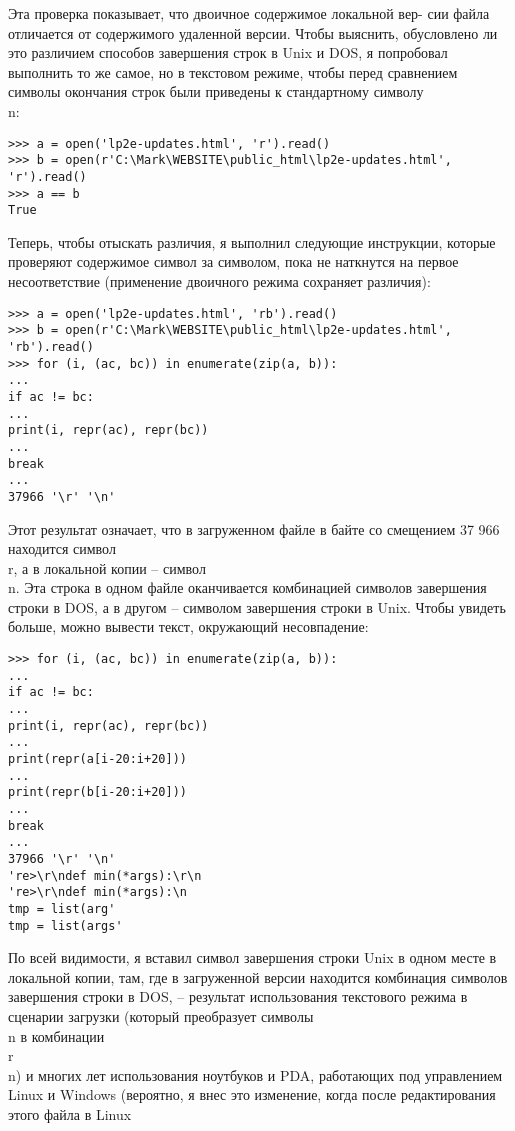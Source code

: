 \documentclass[12pt]{article}
\begin{document}
Эта проверка показывает, что двоичное содержимое локальной вер-
сии файла отличается от содержимого удаленной версии. Чтобы выяснить, обусловлено ли это различием способов завершения строк в Unix
и DOS, я попробовал выполнить то же самое, но в текстовом режиме,
чтобы перед сравнением символы окончания строк были приведены
к стандартному символу \\n:
\begin{verbatim}
>>> a = open('lp2e-updates.html', 'r').read()
>>> b = open(r'C:\Mark\WEBSITE\public_html\lp2e-updates.html', 'r').read()
>>> a == b
True
\end{verbatim}
Теперь, чтобы отыскать различия, я выполнил следующие инструкции,
которые проверяют содержимое символ за символом, пока не наткнутся на первое несоответствие (применение двоичного режима сохраняет
различия):
\begin{verbatim}
>>> a = open('lp2e-updates.html', 'rb').read()
>>> b = open(r'C:\Mark\WEBSITE\public_html\lp2e-updates.html', 'rb').read()
>>> for (i, (ac, bc)) in enumerate(zip(a, b)):
...
if ac != bc:
...
print(i, repr(ac), repr(bc))
...
break
...
37966 '\r' '\n'
\end{verbatim}
Этот результат означает, что в загруженном файле в байте со смещением 37 966 находится символ \\r, а в локальной копии – символ \\n. Эта
строка в одном файле оканчивается комбинацией символов завершения
строки в DOS, а в другом – символом завершения строки в Unix. Чтобы
увидеть больше, можно вывести текст, окружающий несовпадение:
\begin{verbatim}
>>> for (i, (ac, bc)) in enumerate(zip(a, b)):
...
if ac != bc:
...
print(i, repr(ac), repr(bc))
...
print(repr(a[i-20:i+20]))
...
print(repr(b[i-20:i+20]))
...
break
...
37966 '\r' '\n'
're>\r\ndef min(*args):\r\n
're>\r\ndef min(*args):\n
tmp = list(arg'
tmp = list(args'
\end{verbatim}
По всей видимости, я вставил символ завершения строки Unix в одном
месте в локальной копии, там, где в загруженной версии находится
комбинация символов завершения строки в DOS, – результат использования текстового режима в сценарии загрузки (который преобразует символы \\n в комбинации \\r\\n) и многих лет использования ноутбуков и PDA, работающих под управлением Linux и Windows (вероятно,
я внес это изменение, когда после редактирования этого файла в Linux
\end{document}

